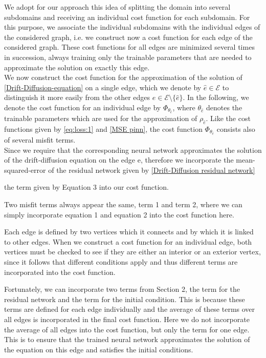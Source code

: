 We adopt for our approach this idea of splitting the domain into several subdomains and receiving an individual cost function for each subdomain. For this purpose, we associate the individual subdomains with the individual edges of the considered graph, i.e. we construct now a cost function for each edge of the considered graph. These cost functions for all edges are minimized several times in succession, always training only the trainable parameters that are needed to approximate the solution on exactly this edge.\\
We now construct the cost function for the approximation of the solution of \cref{Drift-Diffusion-equation} on a single edge, which we denote by $\hat{e} \in \mathcal{E}$ to distinguish it more easily from the other edges $e \in \mathcal{E} \setminus \{ \hat{e}\}$. In the following, we denote the cost function for an individual edge by $\Phi_{\theta_{\hat{e}}}$, where $\theta_{\hat{e}}$ denotes the trainable parameters which are used for the approximation of $\rho_{\hat{e}}$. Like the cost functions given by \cref{eq:loss:1} and \cref{MSE pinn}, the cost function $\Phi_{\theta_{\hat{e}}}$ consists also of several misfit terms. \\
Since we require that the corresponding neural network approximates the solution of the drift-diffusion equation on the edge e, therefore we incorporate the mean-squared-error of the residual network given by \cref{Drift-Diffusion residual network}

the term given by Equation 3 into our cost function.  

Two misfit terms always appear the same, term 1 and term 2, where we can simply incorporate equation 1 and equation 2 into the cost function here. 

Each edge is defined by two vertices which it connects and by which it is linked to other edges. When we construct a cost function for an individual edge, both vertices must be checked to see if they are either an interior or an exterior vertex, since it follows that different conditions apply and thus different terms are incorporated into the cost function. 

Fortunately, we can incorporate two terms from Section 2, the term for the residual network and the term for the initial condition. This is because these terms are defined for each edge individually and the average of these terms over all edges is incorporated in the final cost function. Here we do not incorporate the average of all edges into the cost function, but only the term for one edge. This is to ensure that the trained neural network approximates the solution of the equation on this edge and satisfies the initial conditions.  \\

